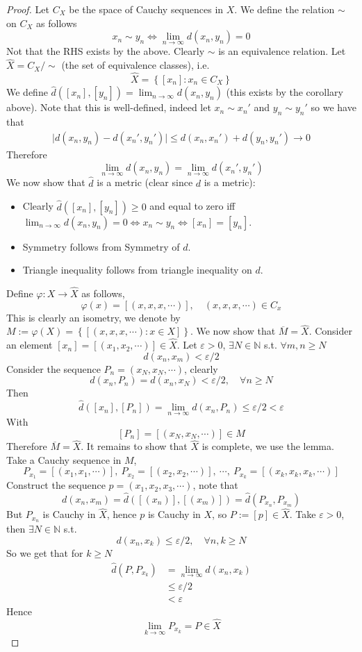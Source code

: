 \documentclass[11pt,a4paper]{article}
\theoremstyle{definition}
\theoremstyle{plain}
\theoremstyle{remark}
\newcommand{\N}{\mathbb{N}}
\renewcommand{\set}[1]{\left\{ #1 \right\}}
\newcommand{\abs}[1]{\lvert #1 \rvert}
\newcommand{\1}{\mathbbm{1}}
\begin{document}
\begin{proof}
    Let $C_X$ be the space of Cauchy sequences in $X$. We define the relation $\sim$ on $C_X$ as follows 
    $$x_n \sim y_n \iff \lim_{n \to \infty} d(x_n, y_n) = 0$$
    Not that the RHS exists by the above. Clearly $\sim$ is an equivalence relation. Let $\hat{X} = C_X / \sim$ (the set of equivalence classes), i.e. 
    $$\hat{X} = \set{[x_n] \colon x_n \in C_X}$$ 
    We define $\hat{d} ([x_n], [y_n]) = \lim_{n \to \infty} d(x_n, y_n)$ (this exists by the corollary above). Note that this is well-defined, indeed let $x_n \sim x_n'$ and $y_n \sim y_n'$ 
    so we have that 
    \begin{align*}
        \abs{d(x_n, y_n)  - d(x_n', y_n')} \le d(x_n, x_n') + d(y_n, y_n')  \to 0
    \end{align*}
    Therefore 
    $$\lim_{n \to \infty} d(x_n, y_n) = \lim_{n \to \infty} d(x_n', y_n')$$
    We now show that $\hat{d}$ is a metric (clear since $d$ is a metric): 
    \begin{itemize}
        \item Clearly $\hat{d} ([x_n], [y_n]) \ge 0$ and equal to zero iff $\lim_{n \to \infty} d(x_n, y_n) = 0 \iff x_n \sim y_n \iff [x_n] = [y_n]$. 
        \item Symmetry follows from Symmetry of $d$. 
        \item Triangle inequality follows from triangle inequality on $d$. 
    \end{itemize} 
    Define $\varphi \colon X \to \hat{X}$ as follows, 
    $$\varphi(x) = [(x,x,x,\cdots)], \quad (x,x,x,\cdots) \in C_x$$
    This is clearly an isometry, we denote by $M := \varphi(X) = \set{[(x,x,x,\cdots) \colon x \in X]}$. We now show that $\overline{M} = \hat{X}$. 
    Consider an element $[x_n] = [(x_1, x_2, \cdots)] \in \hat{X}$. Let $\varepsilon > 0$, $\exists N \in \N$ s.t. $\forall m,n \ge N$ 
    $$d(x_n, x_m) < \varepsilon /2 $$
    Consider the sequence $P_n = (x_N, x_N, \cdots)$, clearly 
    $$d(x_n, P_n) = d(x_n, x_N) < \varepsilon/2, \quad \forall n \ge N$$
    Then 
    $$\hat{d} ([x_n], [P_n]) = \lim_{n \to \infty} d(x_n, P_n) \le \varepsilon/2 < \varepsilon$$
    With 
    $$[P_n] = [(x_N, x_N, \cdots)] \in M$$ 
    Therefore $\overline{M} = \hat{X}$. It remains to show that $\hat{X}$ is complete, we use the lemma. Take a Cauchy sequence in $M$, 
    $$P_{x_1} = [(x_1, x_1, \cdots)], \ P_{x_2} = [(x_2, x_2, \cdots)], \ \cdots, \ P_{x_k} = [(x_k, x_k, x_k, \cdots)]$$
    Construct the sequence $p = (x_1, x_2, x_3, \cdots)$, note that 
    $$d(x_n, x_m) = \hat{d} ([(x_n)], [(x_m)]) = \hat{d} (P_{x_n}, P_{x_m})$$
    But $P_{x_n}$ is Cauchy in $\hat{X}$, hence $p$ is Cauchy in $X$, so $P := [p] \in \hat{X}$. Take $\varepsilon > 0$, then $\exists N \in \N$ s.t. 
    $$d(x_n, x_k) \le \varepsilon/2, \quad \forall n, k \ge N$$
    So we get that for $k \ge N$
    \begin{align*}
        \hat{d} (P, P_{x_k}) &= \lim_{n \to \infty} d(x_n, x_k) \\
        &\le \varepsilon/2 \\
        &< \varepsilon
    \end{align*}
    Hence 
    $$\lim_{k \to\infty} P_{x_k} = P \in \hat{X}$$
\end{proof}
\end{document}
